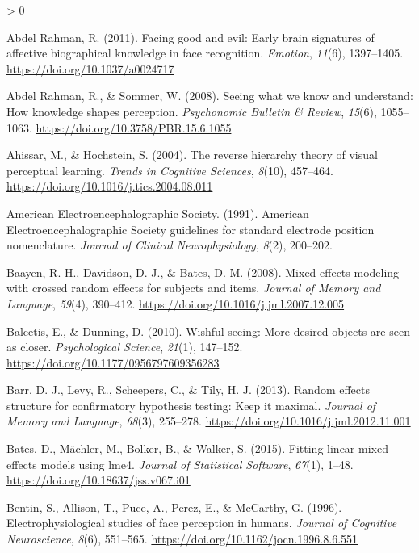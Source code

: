 \documentclass[
  english,
  man,12pt,twoside]{apa7}
\newlength{\cslhangindent}
\newenvironment{CSLReferences}[2] %
 {%
  \setlength{\parindent}{0pt}
  \ifodd #1 \everypar{\setlength{\hangindent}{\cslhangindent}}\ignorespaces\fi
  \ifnum #2 > 0
  \setlength{\parskip}{#2\baselineskip}
  \fi
 }%
 {}
\begin{document}
\hypertarget{refs}{}
\begin{CSLReferences}{1}{0}
\leavevmode\hypertarget{ref-abdelrahman2011}{}%
Abdel Rahman, R. (2011). Facing good and evil: Early brain signatures of affective biographical knowledge in face recognition. \emph{Emotion}, \emph{11}(6), 1397--1405. \url{https://doi.org/10.1037/a0024717}

\leavevmode\hypertarget{ref-abdelrahman2008}{}%
Abdel Rahman, R., \& Sommer, W. (2008). Seeing what we know and understand: How knowledge shapes perception. \emph{Psychonomic Bulletin \& Review}, \emph{15}(6), 1055--1063. \url{https://doi.org/10.3758/PBR.15.6.1055}

\leavevmode\hypertarget{ref-ahissar2004}{}%
Ahissar, M., \& Hochstein, S. (2004). The reverse hierarchy theory of visual perceptual learning. \emph{Trends in Cognitive Sciences}, \emph{8}(10), 457--464. \url{https://doi.org/10.1016/j.tics.2004.08.011}

\leavevmode\hypertarget{ref-americanelectroencephalographicsociety1991}{}%
American Electroencephalographic Society. (1991). {American Electroencephalographic Society} guidelines for standard electrode position nomenclature. \emph{Journal of Clinical Neurophysiology}, \emph{8}(2), 200--202.

\leavevmode\hypertarget{ref-baayen2008}{}%
Baayen, R. H., Davidson, D. J., \& Bates, D. M. (2008). Mixed-effects modeling with crossed random effects for subjects and items. \emph{Journal of Memory and Language}, \emph{59}(4), 390--412. \url{https://doi.org/10.1016/j.jml.2007.12.005}

\leavevmode\hypertarget{ref-balcetis2010}{}%
Balcetis, E., \& Dunning, D. (2010). Wishful seeing: More desired objects are seen as closer. \emph{Psychological Science}, \emph{21}(1), 147--152. \url{https://doi.org/10.1177/0956797609356283}

\leavevmode\hypertarget{ref-barr2013}{}%
Barr, D. J., Levy, R., Scheepers, C., \& Tily, H. J. (2013). Random effects structure for confirmatory hypothesis testing: Keep it maximal. \emph{Journal of Memory and Language}, \emph{68}(3), 255--278. \url{https://doi.org/10.1016/j.jml.2012.11.001}

\leavevmode\hypertarget{ref-R-lme4}{}%
Bates, D., Mächler, M., Bolker, B., \& Walker, S. (2015). Fitting linear mixed-effects models using {lme4}. \emph{Journal of Statistical Software}, \emph{67}(1), 1--48. \url{https://doi.org/10.18637/jss.v067.i01}

\leavevmode\hypertarget{ref-bentin1996}{}%
Bentin, S., Allison, T., Puce, A., Perez, E., \& McCarthy, G. (1996). Electrophysiological studies of face perception in humans. \emph{Journal of Cognitive Neuroscience}, \emph{8}(6), 551--565. \url{https://doi.org/10.1162/jocn.1996.8.6.551}


\end{CSLReferences}
\end{document}
